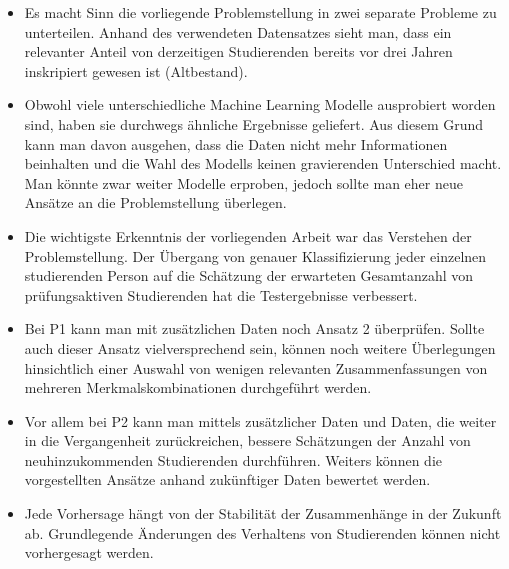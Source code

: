 \begin{itemize}
    \item Es macht Sinn die vorliegende Problemstellung in zwei separate Probleme zu unterteilen. Anhand des verwendeten Datensatzes sieht man, dass 
    ein relevanter Anteil von derzeitigen Studierenden bereits vor drei Jahren inskripiert gewesen ist (Altbestand).

    \item Obwohl viele unterschiedliche Machine Learning Modelle ausprobiert worden sind, haben sie durchwegs \"ahnliche Ergebnisse geliefert. 
    Aus diesem Grund kann man davon ausgehen, dass die Daten nicht mehr Informationen beinhalten und die Wahl des Modells keinen gravierenden Unterschied macht. 
    Man k\"onnte zwar weiter Modelle erproben, jedoch sollte man eher neue Ans\"atze an die Problemstellung \"uberlegen. 

    \item Die wichtigste Erkenntnis der vorliegenden Arbeit war das Verstehen der Problemstellung. Der \"Ubergang von genauer Klassifizierung jeder einzelnen 
    studierenden Person auf die Sch\"atzung der erwarteten Gesamtanzahl von pr\"ufungsaktiven Studierenden hat die Testergebnisse verbessert. 
    
    \item Bei P1 kann man mit zus\"atzlichen Daten noch Ansatz 2 \"uberpr\"ufen. Sollte auch dieser Ansatz vielversprechend sein, k\"onnen noch weitere 
    \"Uberlegungen hinsichtlich einer Auswahl von wenigen relevanten Zusammenfassungen von mehreren Merkmalskombinationen durchgef\"uhrt werden.
    
    \item Vor allem bei P2 kann man mittels zus\"atzlicher Daten und Daten, die weiter in die Vergangenheit zur\"uckreichen, bessere Sch\"atzungen der 
    Anzahl von neuhinzukommenden Studierenden durchf\"uhren. Weiters k\"onnen die vorgestellten Ans\"atze anhand zuk\"unftiger Daten bewertet werden. 

    \item Jede Vorhersage h\"angt von der Stabilit\"at der Zusammenh\"ange in der Zukunft ab. Grundlegende \"Anderungen des Verhaltens von Studierenden 
    k\"onnen nicht vorhergesagt werden. 

    
\end{itemize}